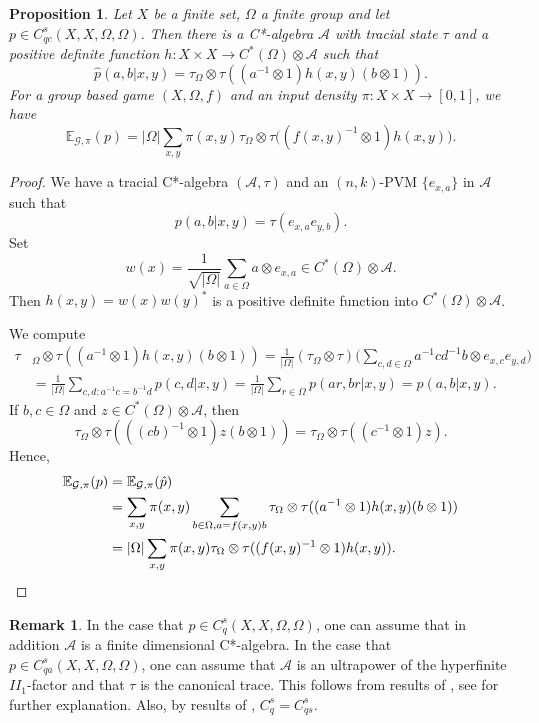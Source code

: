 \documentclass[11pt]{amsart}
\newtheorem{prop}[thm]{Proposition}
\theoremstyle{definition}
\newtheorem{remark}[thm]{Remark}
\newcommand{\bb}[1]{\mathbb{#1}}
\newcommand{\cl}[1]{\mathcal{#1}}
\begin{document}
\begin{prop} Let $X$ be a finite set, $\Omega$ a finite group and let $p \in C_{qc}^s(X, X, \Omega, \Omega)$. Then there is a C*-algebra $\cl A$ with tracial state $\tau$ and a positive definite function $h: X \times X \to C^*(\Omega) \otimes \cl A$
such that
\[ \hat{p}(a,b|x,y) = \tau_{\Omega} \otimes \tau((a^{-1} \otimes 1)h(x,y)(b \otimes 1)).\]
For a group based game $(X,\Omega, f)$ and an input density $\pi:X\times X\to [0,1]$, we have
\[ \bb E_{\cl G,\pi}(p)=|\Omega|\sum_{x,y}\pi(x,y)\tau_\Omega\otimes \tau\big((f(x,y)^{-1}\otimes 1)h(x,y)\big).\]
\end{prop}
\begin{proof} We have a tracial C*-algebra $(\cl A, \tau)$ and an $(n,k)$-PVM $\{ e_{x,a} \}$ in $\cl A$ such that
\[ p(a,b|x,y) = \tau(e_{x,a} e_{y,b}).\]
Set
\[ w(x) = \frac{1}{\sqrt{|\Omega|}}\sum_{a \in \Omega} a \otimes e_{x,a} \in C^*(\Omega) \otimes \cl A.\]
Then $h(x,y) =w(x) w(y)^*$ is a positive definite function into $C^*(\Omega) \otimes \cl A$.

We compute
\begin{align*} \tau&_{\Omega} \otimes \tau ((a^{-1} \otimes 1) h(x,y) (b \otimes 1)) = \frac{1}{|\Omega|}(\tau_{\Omega} \otimes \tau) \big( \sum_{c,d \in \Omega} a^{-1}cd^{-1}b \otimes e_{x,c}e_{y,d} \big) \\ &= \frac{1}{|\Omega|}\sum_{c,d:a^{-1}c=b^{-1}d} p(c,d|x,y) =
\frac{1}{|\Omega|}\sum_{r\in \Omega} p(ar, br | x,y) = \hat{p}(a,b | x,y).
\end{align*}
If $b,c\in \Omega$ and $z\in C^*(\Omega)\otimes \cl A$, then \[\tau_\Omega\otimes \tau(((cb)^{-1}\otimes 1)z(b\otimes 1))=\tau_\Omega\otimes \tau((c^{-1}\otimes 1)z).\] Hence,
\begin{align*}
  \bb E_{\cl G,\pi}(p)&=\bb E_{\cl G,\pi}(\hat p)\\&=\sum_{x,y}\pi(x,y)\sum_{b\in \Omega,a=f(x,y)b} \tau_\Omega\otimes \tau((a^{-1}\otimes 1)h(x,y)(b\otimes 1))\\
  &=|\Omega|\sum_{x,y}\pi(x,y)\tau_\Omega\otimes\tau((f(x,y)^{-1}\otimes 1)h(x,y)).\qedhere
\end{align*}
\end{proof}
\begin{remark} In the case that $p \in C^s_q(X, X, \Omega, \Omega)$, one can assume that in addition $\cl A$ is a finite dimensional C*-algebra. In the case that $p \in C^s_{qa}(X, X, \Omega, \Omega)$, one can assume that $\cl A$ is an ultrapower of the hyperfinite $II_1$-factor and that $\tau$ is the canonical trace. This follows from results of \cite{KPS}, see \cite{HP} for further explanation. Also, by results of \cite{KPS}, $C^s_q= C^s_{qs}$.
\end{remark}
\end{document}
